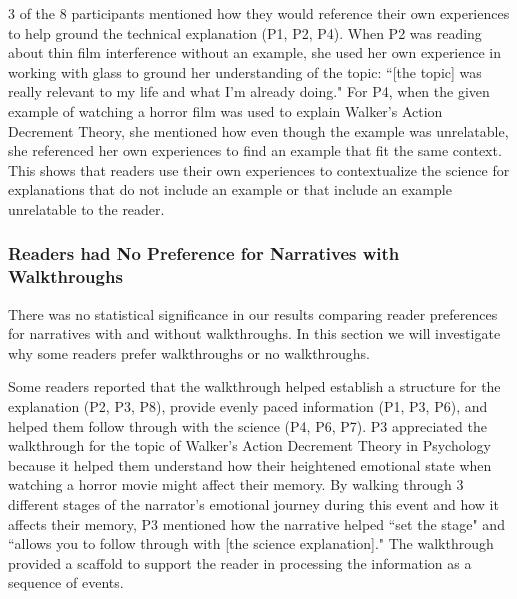 3 of the 8 participants mentioned how they would reference their own experiences to help ground the technical explanation (P1, P2, P4). When P2 was reading about thin film interference without an example, she used her own experience in working with glass to ground her understanding of the topic: ``[the topic] was really relevant to my life and what I'm already doing." For P4, when the given example of watching a horror film was used to explain Walker's Action Decrement Theory, she mentioned how even though the example was unrelatable, she referenced her own experiences to find an example that fit the same context. This shows that readers use their own experiences to contextualize the science for explanations that do not include an example or that include an example unrelatable to the reader.
 


\subsubsection{Readers had No Preference for Narratives with Walkthroughs}
There was no statistical significance in our results comparing reader preferences for narratives with and without walkthroughs. In this section we will investigate why some readers prefer walkthroughs or no walkthroughs. 
 
Some readers reported that the walkthrough helped establish a structure for the explanation (P2, P3, P8), provide evenly paced information (P1, P3, P6), and helped them follow through with the science (P4, P6, P7). P3 appreciated the walkthrough for the topic of Walker's Action Decrement Theory in Psychology because it helped them understand how their heightened emotional state when watching a horror movie might affect their memory. By walking through 3 different stages of the narrator's emotional journey during this event and how it affects their memory, P3 mentioned how the narrative helped ``set the stage" and ``allows you to follow through with [the science explanation]." The walkthrough provided a scaffold to support the reader in processing the information as a sequence of events. 


